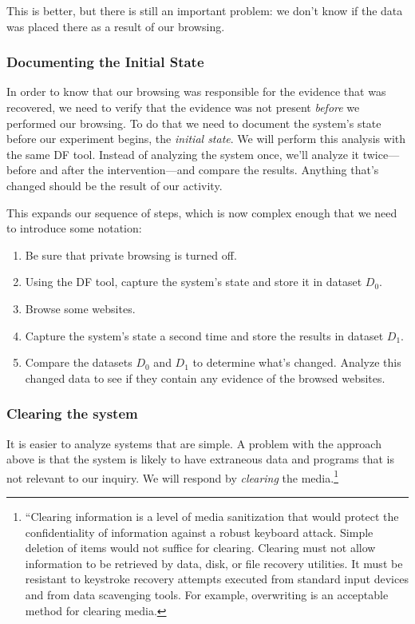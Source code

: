 This is better, but there is still an important problem: we don't know
if the data was placed there as a result of our browsing.

\subsubsection{Documenting the Initial State}
In order to know that our browsing was responsible for the evidence
that was recovered, we need to verify that the evidence was not
present \emph{before} we performed our browsing. To do that we need to
document the system's state before our experiment
begins, the \emph{initial state}. We will perform this analysis with
the same DF tool. Instead of analyzing the system once, we'll analyze it
twice---before and after the intervention---and compare the
results. Anything that's changed should be the result of our activity.

This expands our sequence of steps, which is now complex enough that
we need to introduce some notation:


\begin{enumerate}
\item Be sure that private browsing is turned off.
\item Using the DF tool, capture the system's state and store it in dataset $D_0$.
\item Browse some websites.
\item Capture the system's state a second time and store the results in dataset $D_1$.
\item Compare the datasets $D_0$ and $D_1$ to determine what's
  changed. Analyze this changed data to see if they contain any
  evidence of the browsed websites. 
\end{enumerate}

\subsubsection{Clearing the system}

It is easier to analyze systems that are simple. A problem with the
approach above is that the system is likely to have extraneous data and
programs that is not relevant to our inquiry. We will respond by
\emph{clearing} the media.\footnote{``Clearing information is a level of media sanitization that would protect the confidentiality of information against a robust keyboard attack. Simple deletion of items would not suffice for 
clearing. Clearing must not allow information to be retrieved by data, disk, or file recovery 
utilities. It must be resistant to keystroke recovery attempts
executed from standard input devices and from data scavenging tools. For example, overwriting is an acceptable method 
for clearing media.} 

